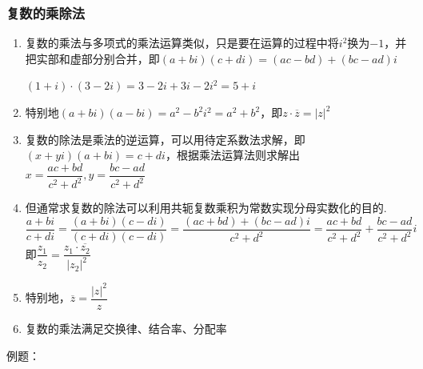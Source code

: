 \subsubsection*{复数的乘除法}
\begin{enumerate}
    \item 复数的乘法与多项式的乘法运算类似，只是要在运算的过程中将$i^2$换为$-1$，并把实部和虚部分别合并，即$(a+bi)(c+di) = (ac-bd) + (bc-ad)i$
    \begin{example}
        $(1+i)\cdot(3-2i) = 3 - 2i + 3i -2i^2 = 5+i$
    \end{example}
    \item 特别地$(a+bi)(a-bi) = a^2 - b^2i^2 = a^2+b^2$，即$z \cdot \overline{z} = |z|^2$
    \item 复数的除法是乘法的逆运算，可以用待定系数法求解，即$(x+yi)(a+bi) = c+di$，根据乘法运算法则求解出$x = \dfrac{ac+bd}{c^2+d^2}, y = \dfrac{bc-ad}{c^2+d^2}$
    \item 但通常求复数的除法可以利用共轭复数乘积为常数实现分母实数化的目的. \\
    $\dfrac{a+bi}{c+di} = \dfrac{(a+bi)(c-di)}{(c+di)(c-di)} = \dfrac{(ac+bd) + (bc-ad)i}{c^2+d^2} = \dfrac{ac+bd}{c^2+d^2} + \dfrac{bc-ad}{c^2+d^2}i$ \\
    即$\dfrac{z_1}{z_2} = \dfrac{z_1 \cdot \overline{z_2}}{|z_2|^2}$
    \item 特别地，$\overline{z} = \dfrac{|z|^2}{z}$
    \item 复数的乘法满足交换律、结合率、分配率
\end{enumerate}
例题：

